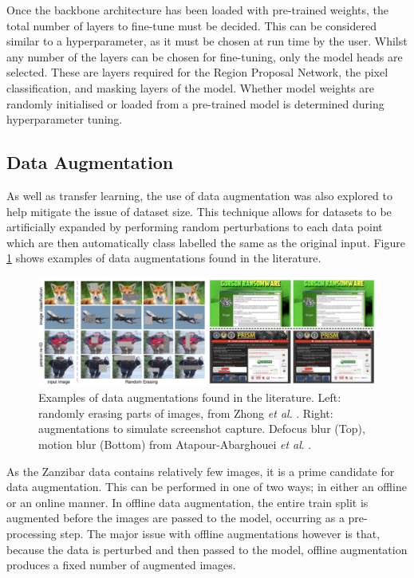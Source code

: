 Once the backbone architecture has been loaded with pre-trained weights, the total number of layers to fine-tune must be decided. This can be considered similar to a hyperparameter, as it must be chosen at run time by the user. Whilst any number of the layers can be chosen for fine-tuning, only the model heads are selected. These are layers required for the Region Proposal Network, the pixel classification, and masking layers of the model. Whether model weights are randomly initialised or loaded from a pre-trained model is determined during hyperparameter tuning.

\subsection{Data Augmentation}\label{ch:cetDet,sec:initialTesting,sub:dataaugmentation}

As well as transfer learning, the use of data augmentation was also explored to help mitigate the issue of dataset size. This technique allows for datasets to be artificially expanded by performing random perturbations to each data point which are then automatically class labelled the same as the original input. Figure \ref{fig:data-aug-examples} shows examples of data augmentations found in the literature.

\begin{figure}[h]
	\begin{center}
		\includegraphics[scale=0.45]{Chapter4/figs/data-augs.png}
	\end{center}
	\caption[Examples of data augmentations found in the literature.]{Examples of data augmentations found in the literature. Left: randomly erasing parts of images, from Zhong \textit{et al}. \cite{zhong_random_2017}. Right: augmentations to simulate screenshot capture. Defocus blur (Top), motion blur (Bottom) from Atapour-Abarghouei \textit{et al}. \cite{atapour-abarghouei_kings_2019}.}
	\label{fig:data-aug-examples}
\end{figure}

As the Zanzibar data contains relatively few images, it is a prime candidate for data augmentation. This can be performed in one of two ways; in either an offline or an online manner. In offline data augmentation, the entire train split is augmented before the images are passed to the model, occurring as a pre-processing step. The major issue with offline augmentations however is that, because the data is perturbed and then passed to the model, offline augmentation produces a fixed number of augmented images. 

